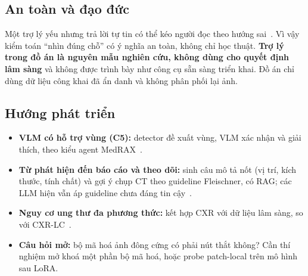 \subsection{An toàn và đạo đức}

Một trợ lý yếu nhưng trả lời tự tin có thể kéo người đọc theo hướng sai~\cite{bernstein2023incorrect,lee2023humanai}.
Vì vậy kiểm toán ``nhìn đúng chỗ'' có ý nghĩa an toàn, không chỉ học thuật. \textbf{Trợ lý trong đồ án là nguyên
mẫu nghiên cứu, không dùng cho quyết định lâm sàng} và không được trình bày như công cụ sẵn sàng triển khai. Đồ
án chỉ dùng dữ liệu công khai đã ẩn danh và không phân phối lại ảnh.

\subsection{Hướng phát triển}

\begin{itemize}
  \item \textbf{VLM có hỗ trợ vùng (C5):} detector đề xuất vùng, VLM xác nhận và giải thích, theo kiểu agent
        MedRAX~\cite{fallahpour2025medrax}.
  \item \textbf{Từ phát hiện đến báo cáo và theo dõi:} sinh câu mô tả nốt (vị trí, kích thước, tính chất) và gợi ý
        chụp CT theo guideline Fleischner, có RAG; các LLM hiện vẫn áp guideline chưa đáng tin cậy~\cite{gamble2024fleischner}.
  \item \textbf{Nguy cơ ung thư đa phương thức:} kết hợp CXR với dữ liệu lâm sàng, so với CXR-LC~\cite{lu2020cxrlc}.
  \item \textbf{Câu hỏi mở:} bộ mã hoá ảnh đông cứng có phải nút thắt không? Cần thí nghiệm mở khoá một phần bộ mã
        hoá, hoặc probe patch-local trên mô hình sau LoRA.
\end{itemize}
